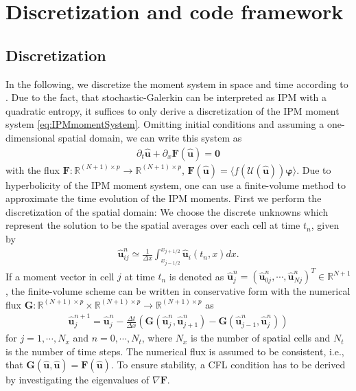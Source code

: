 \section{Discretization and code framework}
\label{sec:framework}
\subsection{Discretization}
In the following, we discretize the moment system in space and time according to \cite{kusch2017maximum}. Due to the fact, that stochastic-Galerkin can be interpreted as IPM with a quadratic entropy, it suffices to only derive a discretization of the IPM moment system \eqref{eq:IPMmomentSystem}.  
Omitting initial conditions and assuming a one-dimensional spatial domain, we can write this system  as
\begin{align*}
\partial_t \bm{\hat u}+\partial_x \bm{F}(\bm{\hat u}) = \bm{0}
\end{align*}
with the flux $\bm{F}:\mathbb{R}^{(N+1)\times p}\to\mathbb{R}^{(N+1)\times p}$, $\bm{F}(\bm{\hat u})=\langle f(\mathcal{U}(\bm{\hat u}))\bm{\varphi} \rangle$. Due to hyperbolicity of the IPM moment system, one can use a finite-volume method to approximate the time evolution of the IPM moments. First we perform the discretization of the spatial domain: We choose the discrete unknowns which represent the solution to be the spatial averages over each cell at time $t_n$, given by
\begin{align*}
\bm{\hat u}_{ij}^n \simeq \frac{1}{\Delta x}\int_{x_{j-1/ 2}}^{x_{j+1/ 2}}\bm{\hat u}_i(t_n,x) dx.
\end{align*}
If a moment vector in cell $j$ at time $t_n$ is denoted as $\bm{\hat u}_j^n = (\bm{\hat u}_{0j}^n,\cdots,\bm{\hat u}_{Nj}^n)^T\in\mathbb{R}^{N+1}$, the finite-volume scheme can be written in conservative form with the numerical flux $\bm{G}:\mathbb{R}^{(N+1)\times p}\times\mathbb{R}^{(N+1)\times p}\to\mathbb{R}^{(N+1)\times p}$ as
\begin{align}\label{eq:IPMDiscretization}
\bm{\hat u}_{j}^{n+1} = \bm{\hat u}_{j}^{n}  - \frac{\Delta t}{\Delta x}\left( \bm{G}(\bm{\hat u}_{j}^{n},\bm{\hat u}_{j+1}^{n})- \bm{G}(\bm{\hat u}_{j-1}^{n},\bm{\hat u}_{j}^{n})\right)
\end{align}
for $j = 1,\cdots,N_x$ and $n = 0,\cdots,N_t$, where $N_x$ is the number of spatial cells and $N_t$ is the number of time steps.
The numerical flux is assumed to be consistent, i.e., that $\bm{G}(\hat{\bm{u}},\hat{\bm{u}})=\bm{F}(\hat{\bm{u}})$.
To ensure stability, a CFL condition has to be derived by investigating the eigenvalues of $\nabla \bm{F}$.

